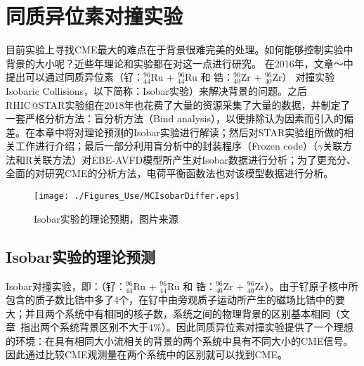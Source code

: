

\setcounter{section}{0}
\setcounter{figure}{0}
\setcounter{table}{0}
\setcounter{equation}{0}

\chapter{同质异位素对撞实验}


目前实验上寻找CME最大的难点在于背景很难完美的处理。如何能够控制实验中背景的大小呢？近些年理论和实验都在对这一点进行研究。
在2016年，文章～\cite{isobar1}中提出可以通过同质异位素（钌：$^{96}_{44}$Ru + $^{96}_{44}$Ru  和 锆：$^{96}_{40}$Zr + $^{96}_{40}$Zr） 对撞实验Isobaric Collisions，以下简称：Isobar实验）来解决背景的问题。之后RHIC@STAR实验组在2018年也花费了大量的资源采集了大量的数据，并制定了一套严格分析方法：盲分析方法（Bind analysis），以便排除认为因素而引入的偏差。在本章中将对理论预测的Isobar实验进行解读；然后对STAR实验组所做的相关工作进行介绍；最后一部分利用盲分析中的封装程序（Frozen code）（$\gamma$关联方法和R关联方法）对EBE-AVFD模型所产生对Isobar数据进行分析；为了更充分、全面的对研究CME的分析方法，电荷平衡函数法也对该模型数据进行分析。



\bigskip

\begin{figure}[htb]
\begin{center}
\texttt{[image: ./Figures\_Use/MCIsobarDiffer.eps]}
\end{center}
\caption{Isobar实验的理论预期，图片来源\cite{isobar1}}
\label{fig:gangisobar}
\end{figure}

\section{Isobar实验的理论预测}

Isobar对撞实验，即：（钌：$^{96}_{44}$Ru + $^{96}_{44}$Ru  和 锆：$^{96}_{40}$Zr + $^{96}_{40}$Zr）。由于钌原子核中所包含的质子数比锆中多了4个，在钌中由旁观质子运动所产生的磁场比锆中的要大；并且两个系统中有相同的核子数，系统之间的物理背景的区别基本相同（文章~\cite{IsobarBackgr}指出两个系统背景区别不大于$4\%$）。因此同质异位素对撞实验提供了一个理想的环境：在具有相同大小流相关的背景的两个系统中具有不同大小的CME信号。因此通过比较CME观测量在两个系统中的区别就可以找到CME。

